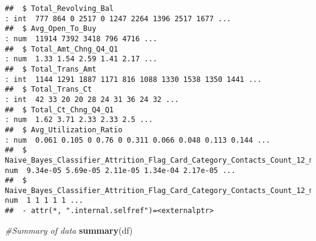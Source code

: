 \documentclass[]{article}
\newenvironment{Shaded}{\begin{snugshade}}{\end{snugshade}}
\newcommand{\CommentTok}[1]{\textcolor[rgb]{0.56,0.35,0.01}{\textit{#1}}}
\newcommand{\KeywordTok}[1]{\textcolor[rgb]{0.13,0.29,0.53}{\textbf{#1}}}
\newcommand{\NormalTok}[1]{#1}
\begin{document}
\begin{verbatim}
##  $ Total_Revolving_Bal                                                                                                               : int  777 864 0 2517 0 1247 2264 1396 2517 1677 ...
##  $ Avg_Open_To_Buy                                                                                                                   : num  11914 7392 3418 796 4716 ...
##  $ Total_Amt_Chng_Q4_Q1                                                                                                              : num  1.33 1.54 2.59 1.41 2.17 ...
##  $ Total_Trans_Amt                                                                                                                   : int  1144 1291 1887 1171 816 1088 1330 1538 1350 1441 ...
##  $ Total_Trans_Ct                                                                                                                    : int  42 33 20 20 28 24 31 36 24 32 ...
##  $ Total_Ct_Chng_Q4_Q1                                                                                                               : num  1.62 3.71 2.33 2.33 2.5 ...
##  $ Avg_Utilization_Ratio                                                                                                             : num  0.061 0.105 0 0.76 0 0.311 0.066 0.048 0.113 0.144 ...
##  $ Naive_Bayes_Classifier_Attrition_Flag_Card_Category_Contacts_Count_12_mon_Dependent_count_Education_Level_Months_Inactive_12_mon_1: num  9.34e-05 5.69e-05 2.11e-05 1.34e-04 2.17e-05 ...
##  $ Naive_Bayes_Classifier_Attrition_Flag_Card_Category_Contacts_Count_12_mon_Dependent_count_Education_Level_Months_Inactive_12_mon_2: num  1 1 1 1 1 ...
##  - attr(*, ".internal.selfref")=<externalptr>
\end{verbatim}

\begin{Shaded}
\begin{Highlighting}[]
\CommentTok{#Summary of data}
\KeywordTok{summary}\NormalTok{(df)}
\end{Highlighting}
\end{Shaded}
\end{document}
